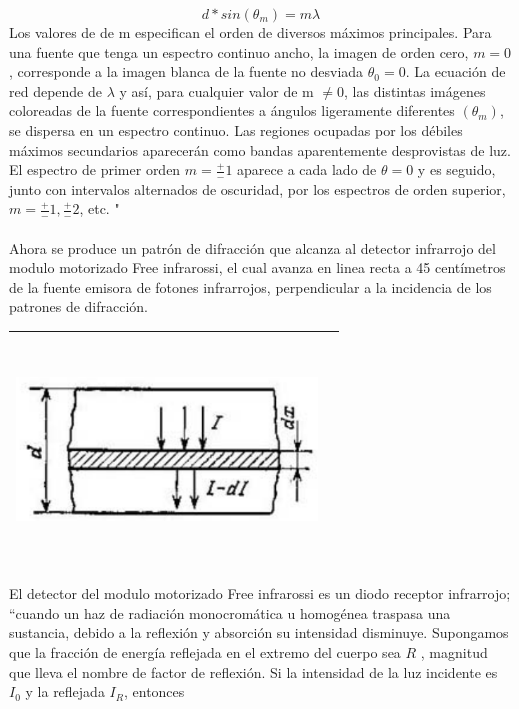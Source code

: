 \documentclass[12]{article}
\newenvironment{Figure}
{\par\medskip\noindent\minipage{\linewidth}}
{\endminipage\par\medskip}
\begin{document}
\begin{multicols}{2}
\begin{equation}
d*sin(\theta _m)= m\lambda 
\end{equation}
Los valores de de m especifican el orden de diversos máximos principales. Para una fuente que tenga un espectro continuo ancho, la imagen de orden cero, $ m = 0 $, corresponde a la imagen blanca de la fuente no desviada $ \theta _0 = 0 $. La ecuación de red depende de $\lambda$ y así, para cualquier valor de m $\ne  0$, las distintas imágenes coloreadas de la fuente correspondientes a ángulos ligeramente diferentes $(\theta _m)$, se dispersa en un espectro continuo. Las regiones ocupadas por los débiles máximos secundarios aparecerán como bandas aparentemente desprovistas de luz. El espectro de primer orden $m = \frac{+}{-}1$ aparece a cada lado de $\theta = 0$ y es seguido, junto con intervalos alternados de oscuridad, por los espectros de orden superior, $m = \frac{+}{-}1, \frac{+}{-}2$, etc. "\cite{OPTICA} \\ \\
Ahora se produce un patrón de difracción que alcanza al detector infrarrojo del modulo motorizado Free infrarossi, el cual avanza en linea recta a 45 centímetros de la fuente emisora de fotones infrarrojos, perpendicular a la incidencia de los patrones de difracción.
\begin{Figure}	
\center
\begin{tabular}{|l|r|}
\hline
\includegraphics[width=8cm, height=6cm]{img/absorcionsemiconductor.png} \\ \hline
\end{tabular}
\label{fig:g2}
\end{Figure}
El detector del modulo motorizado Free infrarossi es un diodo receptor infrarrojo; “cuando un haz de radiación monocromática u homogénea traspasa una sustancia, debido a la reflexión y absorción su intensidad disminuye. Supongamos que la fracción de energía reflejada en el extremo del cuerpo sea $R$ , magnitud  que lleva el nombre de factor de reflexión. Si la intensidad de la luz incidente es $I_{0}$ y la reflejada $I_{R}$, entonces 

\end{multicols}
\end{document}
